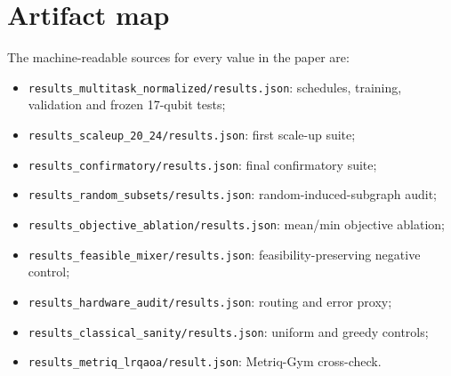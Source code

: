 \documentclass[10pt,twocolumn]{article}
\begin{document}
\section{Artifact map}

The machine-readable sources for every value in the paper are:
\begin{itemize}[leftmargin=*]
    \item \texttt{results\_multitask\_normalized/results.json}: schedules, training, validation and frozen 17-qubit tests;
    \item \texttt{results\_scaleup\_20\_24/results.json}: first scale-up suite;
    \item \texttt{results\_confirmatory/results.json}: final confirmatory suite;
    \item \texttt{results\_random\_subsets/results.json}: random-induced-subgraph audit;
    \item \texttt{results\_objective\_ablation/results.json}: mean/min objective ablation;
    \item \texttt{results\_feasible\_mixer/results.json}: feasibility-preserving negative control;
    \item \texttt{results\_hardware\_audit/results.json}: routing and error proxy;
    \item \texttt{results\_classical\_sanity/results.json}: uniform and greedy controls;
    \item \texttt{results\_metriq\_lrqaoa/result.json}: Metriq-Gym cross-check.
\end{itemize}
\end{document}
